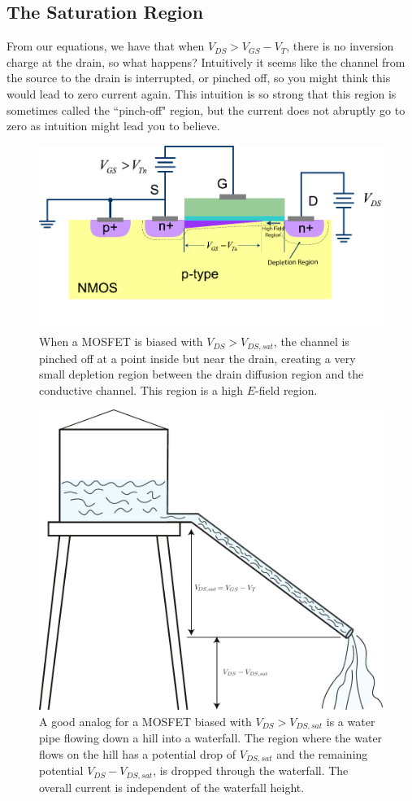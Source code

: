 \subsection{The Saturation Region}
From our equations, we have that when $V_{DS} > V_{GS} - V_T$, there is no inversion charge at the drain, so what happens? Intuitively it seems like the channel from the source to the drain is interrupted, or pinched off, so you might think this would lead to zero current again.  This intuition is so strong that this region is sometimes called the ``pinch-off" region, but the current does not abruptly go to zero as intuition might lead you to believe.  
\begin{figure}[tb]
\centering
\includegraphics[width=.75\columnwidth]{mos_current_sat}
\caption{When a MOSFET is biased with $V_{DS} > V_{DS,sat}$, the channel is pinched off at a point inside but near the drain, creating a very small depletion region between the drain diffusion region and the conductive channel.  This region is a high $E$-field region.}
\label{fig:mos_current_sat}
\end{figure}
\begin{figure}[tb]
\centering
\includegraphics[width=.75\columnwidth]{waterfall}
\caption{A good analog for a MOSFET biased with $V_{DS} > V_{DS,sat}$ is a water pipe flowing down a hill into a waterfall.  The region where the water flows on the hill has a potential drop of $V_{DS,sat}$ and the remaining potential $V_{DS} - V_{DS,sat}$, is dropped through the waterfall.  The overall current is independent of the waterfall height.}
\label{fig:waterfall}
\end{figure}
